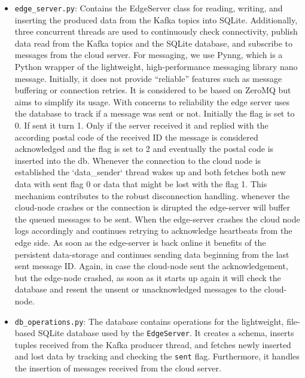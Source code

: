 \documentclass[a4paper]{article}
\begin{document}
\begin{itemize}
    \item \texttt{edge\_server.py}: Contains the EdgeServer class for reading,
        writing, and inserting the produced data from the Kafka topics into
        SQLite. Additionally, three concurrent threads are used to continuously
        check connectivity, publish data read from the Kafka topics and the
        SQLite database, and subscribe to messages from the cloud server. For
        messaging, we use Pynng, which is a Python wrapper of the lightweight,
        high-performance messaging library nano message. Initially, it does not provide
        \enquote{reliable} features such as message buffering or connection
        retries. It is considered to be based on ZeroMQ but aims to simplify its
        usage. With concerns to reliability the edge server uses the database to
        track if a message was sent or not. Initially the flag is set to 0. If sent it turn 1.
        Only if the server received it and replied with the according postal code of the received ID
        the message is considered acknowledged and the flag is set to 2 and eventually the postal code
        is inserted into the db. Whenever the connection to the cloud node is established the `data_sender`
        thread wakes up and both fetches both new data with sent flag 0 or data that might be lost with the
        flag 1. This mechanism contributes to the robust disconnection handling. whenever the cloud-node 
        crashes or the connection is dirupted the edge-server will buffer the queued messages to be sent.
        When the edge-server crashes the cloud node logs accordingly and continues retrying to acknowledge 
        heartbeats from the edge side. As soon as the edge-server is back online it benefits of the persistent
        data-storage and continues sending data beginning from the last sent message ID. Again, in case the 
        cloud-node sent the acknowledgement, but the edge-node crashed, as soon as it starts up again it will 
        check the database and resent the unsent or unacknowledged messages to the cloud-node.

    \item \texttt{db\_operations.py}: The database contains operations for the
        lightweight, file-based SQLite database used by the \texttt{EdgeServer}.
        It creates a schema, inserts tuples received from the Kafka producer
        thread, and fetches newly inserted and lost data by tracking and
        checking the \texttt{sent} flag. Furthermore, it handles the insertion
        of messages received from the cloud server.


\end{itemize}
\end{document}
